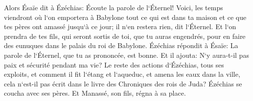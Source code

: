 \verse Alors Ésaïe dit à Ézéchias: Écoute la parole de l`Éternel! 
\verse Voici, les temps viendront où l`on emportera à Babylone tout ce qui est dans ta maison et ce que tes pères ont amassé jusqu`à ce jour; il n`en restera rien, dit l`Éternel. 
\verse Et l`on prendra de tes fils, qui seront sortis de toi, que tu auras engendrés, pour en faire des eunuques dans le palais du roi de Babylone. 
\verse Ézéchias répondit à Ésaïe: La parole de l`Éternel, que tu as prononcée, est bonne. Et il ajouta: N`y aura-t-il pas paix et sécurité pendant ma vie? 
\verse Le reste des actions d`Ézéchias, tous ses exploits, et comment il fit l`étang et l`aqueduc, et amena les eaux dans la ville, cela n`est-il pas écrit dans le livre des Chroniques des rois de Juda? 
\verse Ézéchias se coucha avec ses pères. Et Manassé, son fils, régna à sa place. 

\chapter{}

